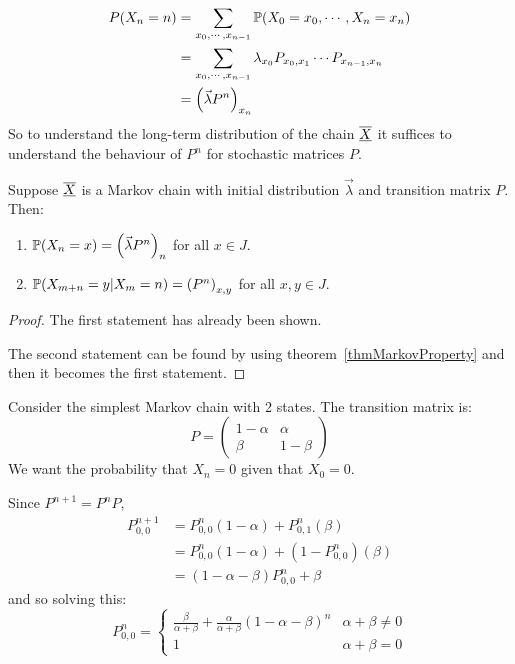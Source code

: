 \documentclass[../Main.tex]{subfiles}
\begin{document}
\begin{align*}
    P(X_n = n) &= \sum_{x_0, \cdots, x_{n - 1}} \P(X_0 = x_0, \cdots, X_n = x_n) \\
    &= \sum_{x_0, \cdots, x_{n-1}} \lambda_{x_0} \Pmat{0}{1} \cdots \Pmat{n-1}{n} \\
    &= \left(\vec{\lambda} P^n\right)_{x_n}
\end{align*}
So to understand the long-term distribution of the chain $\chain{X}$ it suffices to understand the behaviour of $P^n$ for stochastic matrices $P$.

\begin{theorem}
    Suppose $\chain{X}$ is a Markov chain with initial distribution $\vec{\lambda}$ and transition matrix $P$. Then:
    \begin{enumerate}
        \item $\P(X_n = x) = \left(\vec{\lambda} P^n\right)_n$ for all $x \in J$.
        \item $\P(X_{m + n} = y | X_m = n) = \left(P^n\right)_{x, y}$ for all $x, y \in J$.
    \end{enumerate}
    \label{thmMarkovMatPower}
\end{theorem}
\begin{proof}
    The first statement has already been shown.

    The second statement can be found by using theorem~\ref{thmMarkovProperty} and then it becomes the first statement.
\end{proof}
\begin{example}
    Consider the simplest Markov chain with 2 states.
    The transition matrix is:
    \begin{equation*}
        P = 
        \begin{pmatrix}
            1 - \alpha & \alpha \\
            \beta & 1 - \beta
        \end{pmatrix}
    \end{equation*}
    We want the probability that $X_n = 0$ given that $X_0 = 0$.

    Since $P^{n+1} = P^n P$, 
    \begin{align*}
        P_{0, 0}^{n+1} &= P_{0, 0}^n (1 - \alpha) + P_{0, 1}^n (\beta) \\
        &= P_{0, 0}^n (1 - \alpha) + (1 - P_{0, 0}^n) (\beta) \\
        &= (1 - \alpha - \beta) P_{0, 0}^n + \beta
    \end{align*}
    and so solving this:
    \begin{equation*}
        P_{0, 0}^n =
        \begin{cases}
            \frac{\beta}{\alpha + \beta} + \frac{\alpha}{\alpha + \beta} (1 - \alpha - \beta)^n & \alpha + \beta \neq 0 \\
            1 & \alpha + \beta = 0
        \end{cases}
    \end{equation*}
\end{example}
\end{document}
